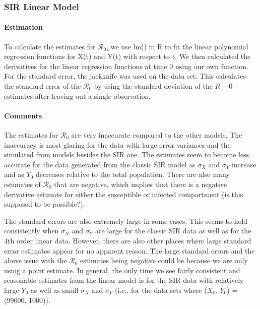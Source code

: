 \documentclass[12pt]{article}
\newcommand{\rr}{\ensuremath{\mathcal{R}_0}}
\begin{document}
\subsubsection{SIR Linear Model}

\paragraph{Estimation}

To calculate the estimates for $\rr$, we use lm() in R to fit the linear polynomial regression functions for X(t) and Y(t) with respect to t. We then calculated the derivatives for the linear regression functions at time 0 using our own function. For the standard error, the jackknife was used on the data set. This calculates the standard error of the $\rr$ by using the standard deviation of the $R-0$ estimates after leaving out a single observation.

\paragraph{Comments}

The estimates for $\rr$ are very inaccurate compared to the other models. The inaccuracy is most glaring for the data with large error variances and the simulated from models besides the SIR one. The estimates seem to become less accurate for the data generated from the classic SIR model as $\sigma_X$ and $\sigma_Y$ increase and as $Y_0$ decreases relative to the total population. There are also many estimates of $\rr$ that are negative, which implies that there is a negative derivative estimate for either the susceptible or infected compartment (is this supposed to be possible?). 

The standard errors are also extremely large in some cases. This seems to hold consistently when $\sigma_X$ and $\sigma_Y$ are large for the classic SIR data as well as for the 4th order linear data. However, there are also other places where large standard error estimates appear for no apparent reason. The large standard errors and the above issue with the $\rr$ estimates being negative could be because we are only using a point estimate. In general, the only time we see fairly consistent and reasonable estimates from the linear model is for the SIR data with relatively large $Y_0$ as well as small $\sigma_X$ and $\sigma_Y$ (i.e., for the data sets where ($X_0$, $Y_0$) = (99000, 1000)).
\end{document}
